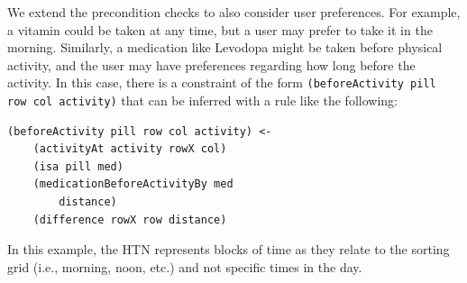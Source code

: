 \documentclass[letterpaper]{article} %
\begin{document}
We extend the precondition checks to also consider user preferences.
For example, a vitamin could be taken at any time, but a user may prefer to take it in the morning.  Similarly, a medication like Levodopa might be taken before physical activity, and the user may have preferences regarding how long before the activity.  In this case, there is a constraint of the form \texttt{(beforeActivity pill row col activity)} that can be inferred with a rule like the following:

\small{
\begin{verbatim}
(beforeActivity pill row col activity) <-
    (activityAt activity rowX col)
    (isa pill med)
    (medicationBeforeActivityBy med
        distance)
    (difference rowX row distance)
\end{verbatim}}

In this example, the HTN represents blocks of time as they relate to the sorting grid (i.e., morning, noon, etc.) and not specific times in the day.






\end{document}
